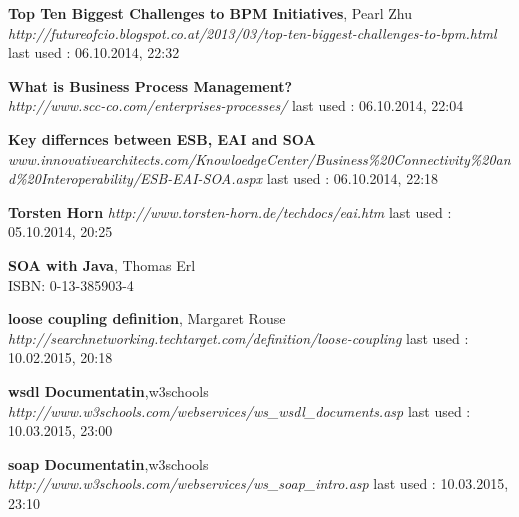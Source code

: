 \documentclass[12pt]{article}
\begin{document}
\begin{thebibliography}{56}
   \textbf{Top Ten Biggest Challenges to BPM Initiatives}, Pearl Zhu\\
  \emph{http://futureofcio.blogspot.co.at/2013/03/top-ten-biggest-challenges-to-bpm.html}
  \newline last used : 06.10.2014, 22:32
  
   \textbf{What is Business Process Management? }\\
  \emph{http://www.scc-co.com/enterprises-processes/}
  \newline last used : 06.10.2014, 22:04


   \textbf{Key differnces between ESB, EAI and SOA}\\
  \emph{www.innovativearchitects.com/KnowloedgeCenter/Business\%20Connectivity\%20and\%20Interoperability/ESB-EAI-SOA.aspx}
  \newline last used : 06.10.2014, 22:18


   \textbf{Torsten Horn}\newline
  \emph{http://www.torsten-horn.de/techdocs/eai.htm}
  \newline last used : 05.10.2014, 20:25


   \textbf{SOA with Java}, Thomas Erl \\
 	 ISBN: 0-13-385903-4
 	 
 	 
   \textbf{loose coupling definition}, Margaret Rouse\\
  \emph{ 	 http://searchnetworking.techtarget.com/definition/loose-coupling}
  \newline last used : 10.02.2015, 20:18

   	\textbf{wsdl Documentatin},w3schools
    \textit{http://www.w3schools.com/webservices/ws_wsdl_documents.asp}
    \newline last used : 10.03.2015, 23:00

	\textbf{soap Documentatin},w3schools
    \textit{http://www.w3schools.com/webservices/ws_soap_intro.asp}
    \newline last used : 10.03.2015, 23:10
\end{thebibliography}
\end{document}
